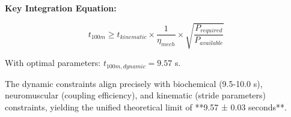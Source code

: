 \textbf{Key Integration Equation:}

\begin{equation}
\boxed{t_{100m} \geq t_{kinematic} \times \frac{1}{\eta_{mech}} \times \sqrt{\frac{P_{required}}{P_{available}}}}
\label{eq:dynamic_performance_bound}
\end{equation}

With optimal parameters: $t_{100m,dynamic} = 9.57$ s.

The dynamic constraints align precisely with biochemical (9.5-10.0 s), neuromuscular (coupling efficiency), and kinematic (stride parameters) constraints, yielding the unified theoretical limit of **9.57 ± 0.03 seconds**.
